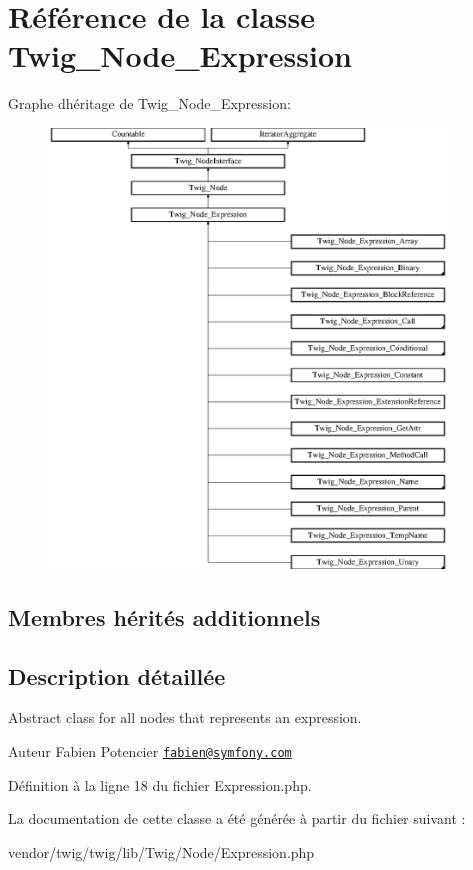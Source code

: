 \hypertarget{class_twig___node___expression}{}\section{Référence de la classe Twig\+\_\+\+Node\+\_\+\+Expression}
\label{class_twig___node___expression}
Graphe d\textquotesingle{}héritage de Twig\+\_\+\+Node\+\_\+\+Expression\+:\begin{figure}[H]
\begin{center}
\leavevmode
\includegraphics[height=11.666667cm]{class_twig___node___expression}
\end{center}
\end{figure}
\subsection*{Membres hérités additionnels}


\subsection{Description détaillée}
Abstract class for all nodes that represents an expression.

\begin{DoxyAuthor}{Auteur}
Fabien Potencier \href{mailto:fabien@symfony.com}{\tt fabien@symfony.\+com} 
\end{DoxyAuthor}


Définition à la ligne 18 du fichier Expression.\+php.



La documentation de cette classe a été générée à partir du fichier suivant \+:\begin{DoxyCompactItemize}
\item 
vendor/twig/twig/lib/\+Twig/\+Node/Expression.\+php\end{DoxyCompactItemize}
